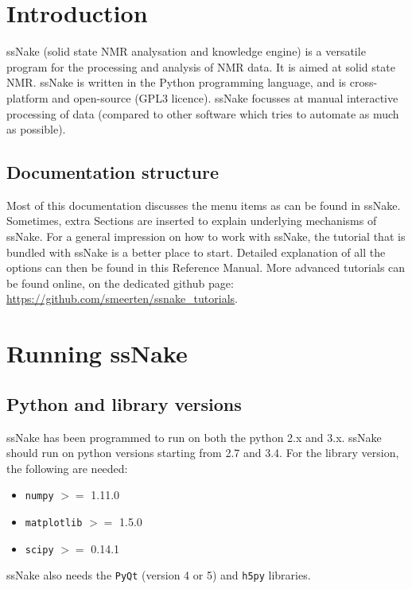 \documentclass[11pt,a4paper]{article}
\renewcommand\cfttoctitlefont{\color{black!70}\Huge\fontfamily{SourceSansPro-LF}\bfseries}
\begin{document}


\thispagestyle{empty}
\newpage
\mbox{}


\renewcommand\cfttoctitlefont{\color{black}\Huge\fontfamily{SourceSansPro-LF}\bfseries}
\setcounter{tocdepth}{2}
\tableofcontents %

\renewcommand\cfttoctitlefont{\color{black!70}\Huge\fontfamily{SourceSansPro-LF}\bfseries}


\section{Introduction}
ssNake (solid state NMR analysation and knowledge engine) is a versatile program for the processing
and analysis of NMR data. It is aimed at solid state NMR. ssNake is written in the Python programming
language, and is cross-platform and open-source (GPL3 licence). ssNake focusses at manual interactive
processing of data (compared to other software which tries to automate as much as possible).

\subsection{Documentation structure}
Most of this documentation discusses the menu items as can be found in ssNake. Sometimes, extra
Sections are inserted to explain underlying mechanisms of ssNake. For a general impression on how to
work with ssNake, the tutorial that is bundled with ssNake is a better place to start. Detailed
explanation of all the options can then be found in this Reference Manual. More advanced tutorials
can be found online, on the dedicated github page:
\url{https://github.com/smeerten/ssnake_tutorials}.


\section{Running ssNake}
\subsection{Python and library versions}
ssNake has been programmed to run on both the python 2.x and 3.x. ssNake should run on python
versions starting from 2.7 and 3.4.
For the library version, the following are needed:
\begin{itemize}
  \item  \texttt{numpy} $>=$ 1.11.0
  \item  \texttt{matplotlib} $>=$ 1.5.0
  \item  \texttt{scipy} $>=$ 0.14.1
\end{itemize}
ssNake also needs the \texttt{PyQt} (version 4 or 5) and \texttt{h5py} libraries.
\end{document}

